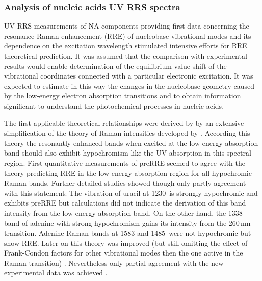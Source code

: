 \subsubsection{Analysis of nucleic acids UV RRS spectra}

UV RRS measurements of NA components providing first data concerning the
resonance Raman enhancement (RRE) of nucleobase vibrational modes and its
dependence on the excitation wavelength stimulated intensive efforts for RRE
theoretical prediction.
It was assumed that the comparison with experimental results would enable
determination of the equilibrium value shift of the vibrational coordinates
connected with a particular electronic excitation.
It was expected to estimate in this way the changes in the nucleobase geometry
caused by the low-energy electron absorption transitions and to obtain
information significant to understand the photochemical processes in nucleic
acids.

The first applicable theoretical relationships were derived by
\textcite{Peticolas1970}
by an extensive simplification of the theory of Raman intensities developed by
\textcite{Albrecht1961}.
According this theory the resonantly enhanced bands when excited at the
low-energy absorption band should also exhibit hypochromism like the UV
absorption in this spectral region.
First quantitative measurements of preRRE
\parencite{Kalantar1972}
seemed to agree with the theory predicting RRE in the low-energy absorption
region for all hypochromic Raman bands.
Further detailed studies showed though only partly agreement with this
statement:
The vibration of uracil at 1230\,\icm{} is strongly hypochromic
\parencite{%
	Small1971,%
	Small1971a%
}
and exhibits preRRE
\parencite{Tsuboi1971}
but calculations did not indicate the derivation of this band intensity from
the low-energy absorption band.
On the other hand, the 1338\,\icm{} band of adenine with strong hypochromism
\parencite{%
	Aylward1970,%
	Lafleur1972,%
	Small1971%
}
gains its intensity from the 260\,nm transition.
Adenine Raman bands at 1583 and 1485\,\icm{} were not hypochromic but show RRE.
Later on this theory was improved (but still omitting the effect of
Frank-Condon factors for other vibrational modes then the one active in the
Raman transition)
\parencite{%
	Blazej1977,%
	Warshel1977a%
}.
Nevertheless only partial agreement with the new experimental data was achieved
\parencite{%
	Peticolas1979,%
	Peticolas1980%
}.

